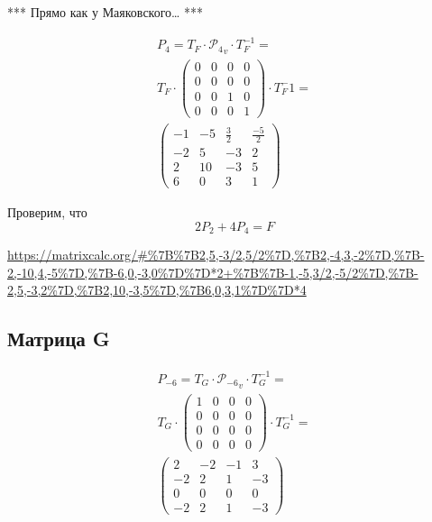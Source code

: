 \documentclass[12pt, a4paper]{article}
\begin{document}
    *** Прямо как у Маяковского… ***

    \begin{multline}
        P_4 = T_F \cdot {\mathcal{P}_4}_v \cdot T_F^{-1} = \\
        T_F \cdot \left(\begin{matrix}
            0 & 0 & 0 & 0 \\
            0 & 0 & 0 & 0 \\
            0 & 0 & 1 & 0 \\
            0 & 0 & 0 & 1
        \end{matrix}\right) \cdot T_F^-1 = \\
        \left(\begin{matrix}
            -1 & -5 & \frac{3}{2} & \frac{-5}{2} \\
            -2 & 5 & -3 & 2 \\
            2 & 10 & -3 & 5 \\
            6 & 0 & 3 & 1
        \end{matrix}\right)
    \end{multline}

    Проверим, что 
    \begin{equation}
        2 P_{2} + 4 P_{4} = F
    \end{equation}

    \url{https://matrixcalc.org/#%7B%7B2,5,-3/2,5/2%7D,%7B2,-4,3,-2%7D,%7B-2,-10,4,-5%7D,%7B-6,0,-3,0%7D%7D*2+%7B%7B-1,-5,3/2,-5/2%7D,%7B-2,5,-3,2%7D,%7B2,10,-3,5%7D,%7B6,0,3,1%7D%7D*4}


    \subsection{Матрица G}

    \begin{multline}
        P_{-6} = T_G \cdot {\mathcal{P}_{-6}}_v \cdot T_G^{-1} = \\
        T_G \cdot \left(\begin{matrix}
            1 & 0 & 0 & 0 \\
            0 & 0 & 0 & 0 \\
            0 & 0 & 0 & 0 \\
            0 & 0 & 0 & 0
        \end{matrix}\right) \cdot T_G^{-1} = \\
        \left(\begin{matrix}
            2 & -2 & -1 & 3 \\
            -2 & 2 & 1 & -3 \\
            0 & 0 & 0 & 0 \\
            -2 & 2 & 1 & -3
        \end{matrix}\right)
    \end{multline}
\end{document}
